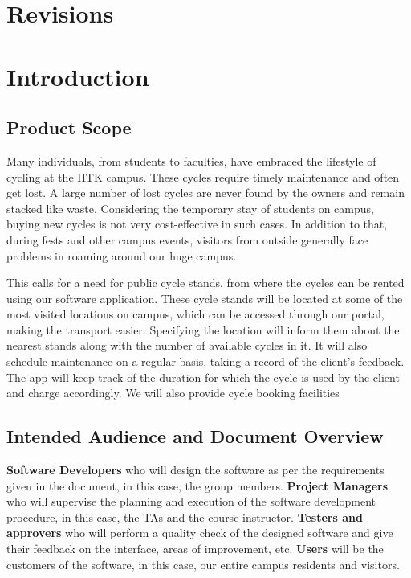 \documentclass[11pt]{article}
\begin{document}
\newpage
\section{Revisions}

\newpage
\section{Introduction}
\subsection{Product Scope}
Many individuals, from students to faculties, have embraced the lifestyle of cycling at the IITK campus. These cycles require timely maintenance and often get lost. A large number of lost cycles are never found by the owners and remain stacked like waste. Considering the temporary stay of students on campus, buying new cycles is not very cost-effective in such cases. In addition to that, during fests and other campus events, visitors from outside generally face problems in roaming around our huge campus.

This calls for a need for public cycle stands, from where the cycles can be rented using our  software application. These cycle stands will be located at some of the most visited locations on campus, which can be accessed through our portal, making the transport easier. Specifying the location will inform them about the nearest stands along with the number of available cycles in it.
It will also schedule maintenance on a regular basis, taking a record of the client’s feedback. The app will keep track of the duration for which the cycle is used by the client and charge accordingly. We will also provide cycle booking facilities

\subsection{Intended Audience and Document Overview}
\textbf{Software Developers} who will design the software as per the requirements given in the document, in this case, the group members. \textbf{Project Managers} who will supervise the planning and execution of the software development procedure, in this case, the TAs and the course instructor. \textbf{Testers and approvers} who will perform a quality check of the designed software and give their feedback on the interface, areas of improvement, etc. \textbf{Users} will be the customers of the software, in this case, our entire campus residents and visitors.
\end{document}

